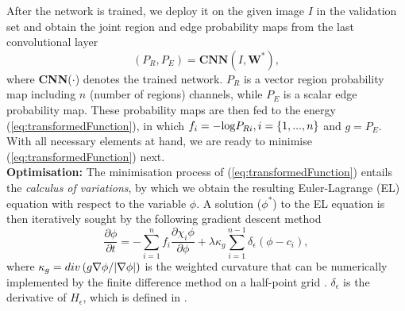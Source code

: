 \documentclass[runningheads,a4paper]{llncs}
\begin{document}
After the network is trained, we deploy it on the given image $I$ in the validation set and obtain the joint region and edge probability maps from the last convolutional layer
\begin{equation}
(P_R,P_E)=\textbf{CNN}(I,\textbf{W}^*),
\end{equation}
where \textbf{CNN}($\cdot$) denotes the trained network. $P_R$ is a vector region probability map including $n$ (number of regions) channels, while $P_E$ is a scalar edge probability map. These probability maps are then fed to the energy (\ref{eq:transformedFunction}), in which $f_i = -{\rm{log}}P_{Ri}, i=\{1,...,n\}$ and $g=P_E$. With all necessary elements at hand, we are ready to minimise (\ref{eq:transformedFunction}) next. \\

\noindent\textbf{Optimisation:} The minimisation process of (\ref{eq:transformedFunction}) entails the \textit{calculus of variations}, by which we obtain the resulting Euler-Lagrange (EL) equation with respect to the variable $\phi$. A solution ($\phi^*$) to the EL equation is then iteratively sought by the following gradient descent method
\begin{equation} \label{eq:GD}
\frac{{\partial \phi }}{{\partial t}} =  - \sum\limits_{i = 1}^n {{f_i}\frac{{\partial {\chi _i}\phi }}{{\partial \phi }}}  + \lambda {\kappa _g}\sum\limits_{i = 1}^{n - 1} {\delta_\epsilon \left( {\phi  - {c_i}} \right)},
\end{equation}
where ${\kappa _g} = div\left( {g{{\nabla \phi } \mathord{\left/{\vphantom {{\nabla \phi } {\left| {\nabla \phi } \right|}}} \right.\kern-\nulldelimiterspace} {\left| {\nabla \phi } \right|}}} \right)$ is the weighted curvature that can be numerically implemented by the finite difference method on a half-point grid \cite{duan2015surface}. $\delta_\epsilon$ is the derivative of $H_\epsilon$, which is defined in \cite{chung2009image}. 
\end{document}
